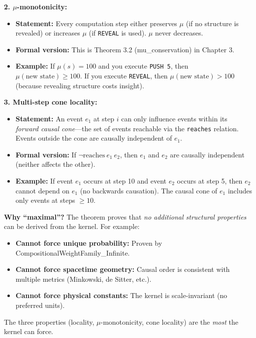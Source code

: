 \textbf{2. $\mu$-monotonicity:}
\begin{itemize}
    \item \textbf{Statement:} Every computation step either preserves $\mu$ (if no structure is revealed) or increases $\mu$ (if \texttt{REVEAL} is used). $\mu$ never decreases.
    \item \textbf{Formal version:} This is Theorem 3.2 (mu\_conservation) in Chapter 3.
    \item \textbf{Example:} If $\mu(s) = 100$ and you execute \texttt{PUSH 5}, then $\mu(\text{new state}) \geq 100$. If you execute \texttt{REVEAL}, then $\mu(\text{new state}) > 100$ (because revealing structure costs insight).
\end{itemize}

\textbf{3. Multi-step cone locality:}
\begin{itemize}
    \item \textbf{Statement:} An event $e_1$ at step $i$ can only influence events within its \textit{forward causal cone}---the set of events reachable via the \texttt{reaches} relation. Events outside the cone are causally independent of $e_1$.
    \item \textbf{Formal version:} If $\neg \text{reaches}\ e_1\ e_2$, then $e_1$ and $e_2$ are causally independent (neither affects the other).
    \item \textbf{Example:} If event $e_1$ occurs at step 10 and event $e_2$ occurs at step 5, then $e_2$ cannot depend on $e_1$ (no backwards causation). The causal cone of $e_1$ includes only events at steps $\geq 10$.
\end{itemize}

\textbf{Why ``maximal''?} The theorem proves that \textit{no additional structural properties} can be derived from the kernel. For example:
\begin{itemize}
    \item \textbf{Cannot force unique probability:} Proven by CompositionalWeightFamily\_Infinite.
    \item \textbf{Cannot force spacetime geometry:} Causal order is consistent with multiple metrics (Minkowski, de Sitter, etc.).
    \item \textbf{Cannot force physical constants:} The kernel is scale-invariant (no preferred units).
\end{itemize}
The three properties (locality, $\mu$-monotonicity, cone locality) are the \textit{most} the kernel can force.

